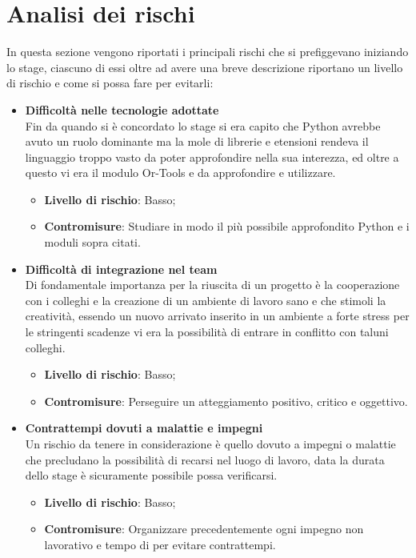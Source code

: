 \section{Analisi dei rischi}
In questa sezione vengono riportati i principali rischi che si prefiggevano iniziando lo stage, ciascuno di essi oltre ad avere una breve descrizione riportano un livello di rischio e come si possa fare per evitarli:
\begin{itemize}
	\item \textbf{Difficoltà nelle tecnologie adottate}\\
	      Fin da quando si è concordato lo stage si era capito che Python avrebbe avuto un ruolo dominante ma la mole di librerie e etensioni rendeva il linguaggio troppo vasto da poter approfondire nella sua interezza, ed oltre a questo vi era il modulo Or-Tools e  da approfondire e utilizzare.
	      \begin{itemize}
	      	\item \textbf{Livello di rischio}: Basso;
	      	\item \textbf{Contromisure}: Studiare in modo il più possibile approfondito Python e i moduli sopra citati.
	      \end{itemize}
	\item \textbf{Difficoltà di integrazione nel team}\\
	      Di fondamentale importanza per la riuscita di un progetto è la cooperazione con i colleghi e la creazione di un ambiente di lavoro sano e che stimoli la creatività, essendo un nuovo arrivato inserito in un ambiente a forte stress per le stringenti scadenze vi era la possibilità di entrare in conflitto con taluni colleghi.
	      \begin{itemize}
	      	\item \textbf{Livello di rischio}: Basso;
	      	\item \textbf{Contromisure}: Perseguire un atteggiamento positivo, critico e oggettivo.
	      \end{itemize}
	\item \textbf{Contrattempi dovuti a malattie e impegni}\\
	      Un rischio da tenere in considerazione è quello dovuto a impegni o malattie che precludano la possibilità di recarsi nel luogo di lavoro, data la durata dello stage è sicuramente possibile possa verificarsi.
	      \begin{itemize}
	      	\item \textbf{Livello di rischio}: Basso;
	      	\item \textbf{Contromisure}: Organizzare precedentemente ogni impegno non lavorativo e tempo di  per evitare contrattempi.

\end{itemize}
\end{itemize}
